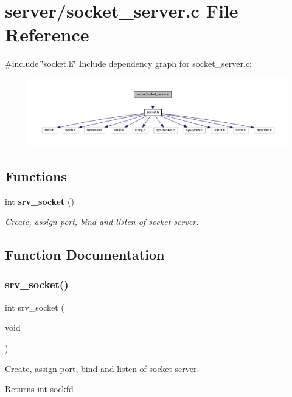 \section{server/socket\+\_\+server.c File Reference}
\label{socket__server_8c}
{\ttfamily \#include \char`\"{}socket.\+h\char`\"{}}\newline
Include dependency graph for socket\+\_\+server.\+c\+:\nopagebreak
\begin{figure}[H]
\begin{center}
\leavevmode
\includegraphics[width=350pt]{socket__server_8c__incl}
\end{center}
\end{figure}
\subsection*{Functions}
\begin{DoxyCompactItemize}
\item 
int \textbf{ srv\+\_\+socket} ()
\begin{DoxyCompactList}\small\item\em Create, assign port, bind and listen of socket server. \end{DoxyCompactList}\end{DoxyCompactItemize}


\subsection{Function Documentation}
\mbox{\label{socket__server_8c_abaa85d7aff16c338adf9a408c151bc28}} 
\subsubsection{srv\+\_\+socket()}
{\footnotesize\ttfamily int srv\+\_\+socket (\begin{DoxyParamCaption}\item[{void}]{ }\end{DoxyParamCaption})}



Create, assign port, bind and listen of socket server. 

\begin{DoxyReturn}{Returns}
int sockfd 
\end{DoxyReturn}
